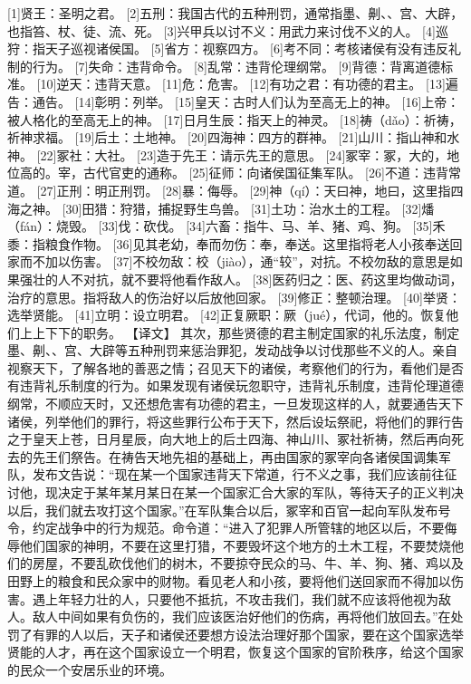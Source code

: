 \documentclass[a4paper,12pt,UTF8,twoside]{ctexbook}
\begin{document}
[1]贤王：圣明之君。
[2]五刑：我国古代的五种刑罚，通常指墨、劓、、宫、大辟，也指笞、杖、徒、流、死。
[3]兴甲兵以讨不义：用武力来讨伐不义的人。
[4]巡狩：指天子巡视诸侯国。
[5]省方：视察四方。
[6]考不同：考核诸侯有没有违反礼制的行为。
[7]失命：违背命令。
[8]乱常：违背伦理纲常。
[9]背德：背离道德标准。
[10]逆天：违背天意。
[11]危：危害。
[12]有功之君：有功德的君主。
[13]遍告：通告。
[14]彰明：列举。
[15]皇天：古时人们认为至高无上的神。
[16]上帝：被人格化的至高无上的神。
[17]日月生辰：指天上的神灵。
[18]祷（dǎo）：祈祷，祈神求福。
[19]后土：土地神。
[20]四海神：四方的群神。
[21]山川：指山神和水神。
[22]冢社：大社。
[23]造于先王：请示先王的意思。
[24]冢宰：冢，大的，地位高的。宰，古代官吏的通称。
[25]征师：向诸侯国征集军队。
[26]不道：违背常道。
[27]正刑：明正刑罚。
[28]暴：侮辱。
[29]神（qí）：天曰神，地曰，这里指四海之神。
[30]田猎：狩猎，捕捉野生鸟兽。
[31]土功：治水土的工程。
[32]燔（fán）：烧毁。
[33]伐：砍伐。
[34]六畜：指牛、马、羊、猪、鸡、狗。
[35]禾黍：指粮食作物。
[36]见其老幼，奉而勿伤：奉，奉送。这里指将老人小孩奉送回家而不加以伤害。
[37]不校勿敌：校（jiào），通“较”，对抗。不校勿敌的意思是如果强壮的人不对抗，就不要将他看作敌人。
[38]医药归之：医、药这里均做动词，治疗的意思。指将敌人的伤治好以后放他回家。
[39]修正：整顿治理。
[40]举贤：选举贤能。
[41]立明：设立明君。
[42]正复厥职：厥（jué），代词，他的。恢复他们上上下下的职务。
【译文】
其次，那些贤德的君主制定国家的礼乐法度，制定墨、劓、、宫、大辟等五种刑罚来惩治罪犯，发动战争以讨伐那些不义的人。亲自视察天下，了解各地的善恶之情；召见天下的诸侯，考察他们的行为，看他们是否有违背礼乐制度的行为。如果发现有诸侯玩忽职守，违背礼乐制度，违背伦理道德纲常，不顺应天时，又还想危害有功德的君主，一旦发现这样的人，就要通告天下诸侯，列举他们的罪行，将这些罪行公布于天下，然后设坛祭祀，将他们的罪行告之于皇天上苍，日月星辰，向大地上的后土四海、神山川、冢社祈祷，然后再向死去的先王们祭告。在祷告天地先祖的基础上，再由国家的冢宰向各诸侯国调集军队，发布文告说：“现在某一个国家违背天下常道，行不义之事，我们应该前往征讨他，现决定于某年某月某日在某一个国家汇合大家的军队，等待天子的正义判决以后，我们就去攻打这个国家。”在军队集合以后，冢宰和百官一起向军队发布号令，约定战争中的行为规范。命令道：“进入了犯罪人所管辖的地区以后，不要侮辱他们国家的神明，不要在这里打猎，不要毁坏这个地方的土木工程，不要焚烧他们的房屋，不要乱砍伐他们的树木，不要掠夺民众的马、牛、羊、狗、猪、鸡以及田野上的粮食和民众家中的财物。看见老人和小孩，要将他们送回家而不得加以伤害。遇上年轻力壮的人，只要他不抵抗，不攻击我们，我们就不应该将他视为敌人。敌人中间如果有负伤的，我们应该医治好他们的伤病，再将他们放回去。”在处罚了有罪的人以后，天子和诸侯还要想方设法治理好那个国家，要在这个国家选举贤能的人才，再在这个国家设立一个明君，恢复这个国家的官阶秩序，给这个国家的民众一个安居乐业的环境。
\end{document}
